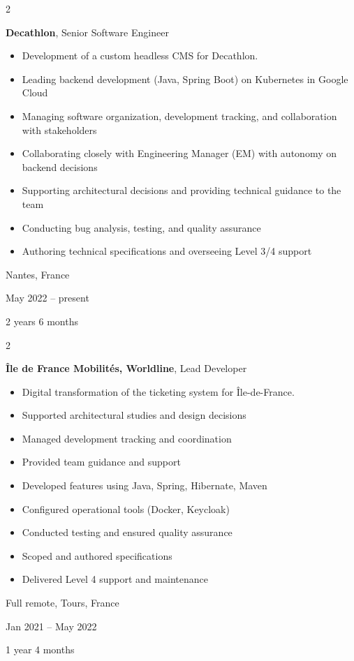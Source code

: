 \documentclass[10pt, letterpaper]{article}
\newenvironment{highlights}{
    \begin{itemize}[
        topsep=0.10 cm,
        parsep=0.10 cm,
        partopsep=0pt,
        itemsep=0pt,
        leftmargin=0.4 cm + 10pt
    ]
}{
    \end{itemize}
} %
\newenvironment{twocolentry}[2][]{
    \onecolentry
    \def\secondColumn{#2}
    \setcolumnwidth{\fill, 4.5 cm}
    \begin{paracol}{2}
}{
    \switchcolumn \raggedleft \secondColumn
    \end{paracol}
    \endonecolentry
} %
\begin{document}
        
        \begin{twocolentry}{
            Nantes, France

        May 2022 – present

        2 years 6 months
        }
            \textbf{Decathlon}, Senior Software Engineer
            \begin{highlights}
                \item Development of a custom headless CMS for Decathlon.
                \item Leading backend development (Java, Spring Boot) on Kubernetes in Google Cloud
                \item Managing software organization, development tracking, and collaboration with stakeholders
                \item Collaborating closely with Engineering Manager (EM) with autonomy on backend decisions
                \item Supporting architectural decisions and providing technical guidance to the team
                \item Conducting bug analysis, testing, and quality assurance
                \item Authoring technical specifications and overseeing Level 3/4 support
            \end{highlights}
        \end{twocolentry}


        \vspace{0.2 cm}

        \begin{twocolentry}{
            Full remote, Tours, France

        Jan 2021 – May 2022

        1 year 4 months
        }
            \textbf{Île de France Mobilités, Worldline}, Lead Developer
            \begin{highlights}
                \item Digital transformation of the ticketing system for Île-de-France.
                \item Supported architectural studies and design decisions
                \item Managed development tracking and coordination
                \item Provided team guidance and support
                \item Developed features using Java, Spring, Hibernate, Maven
                \item Configured operational tools (Docker, Keycloak)
                \item Conducted testing and ensured quality assurance
                \item Scoped and authored specifications
                \item Delivered Level 4 support and maintenance
            \end{highlights}
        \end{twocolentry}
\end{document}
